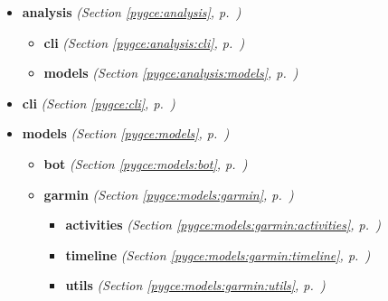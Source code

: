 \begin{itemize}
\setlength{\parskip}{0ex}
\item \textbf{analysis}
  \textit{(Section \ref{pygce:analysis}, p.~\pageref{pygce:analysis})}

  \begin{itemize}
\setlength{\parskip}{0ex}
    \item \textbf{cli}
  \textit{(Section \ref{pygce:analysis:cli}, p.~\pageref{pygce:analysis:cli})}

    \item \textbf{models}
  \textit{(Section \ref{pygce:analysis:models}, p.~\pageref{pygce:analysis:models})}

  \end{itemize}
\item \textbf{cli}
  \textit{(Section \ref{pygce:cli}, p.~\pageref{pygce:cli})}

\item \textbf{models}
  \textit{(Section \ref{pygce:models}, p.~\pageref{pygce:models})}

  \begin{itemize}
\setlength{\parskip}{0ex}
    \item \textbf{bot}
  \textit{(Section \ref{pygce:models:bot}, p.~\pageref{pygce:models:bot})}

    \item \textbf{garmin}
  \textit{(Section \ref{pygce:models:garmin}, p.~\pageref{pygce:models:garmin})}

      \begin{itemize}
    \setlength{\parskip}{0ex}
        \item \textbf{activities}
  \textit{(Section \ref{pygce:models:garmin:activities}, p.~\pageref{pygce:models:garmin:activities})}

        \item \textbf{timeline}
  \textit{(Section \ref{pygce:models:garmin:timeline}, p.~\pageref{pygce:models:garmin:timeline})}

        \item \textbf{utils}
  \textit{(Section \ref{pygce:models:garmin:utils}, p.~\pageref{pygce:models:garmin:utils})}

      \end{itemize}
  \end{itemize}
\end{itemize}




